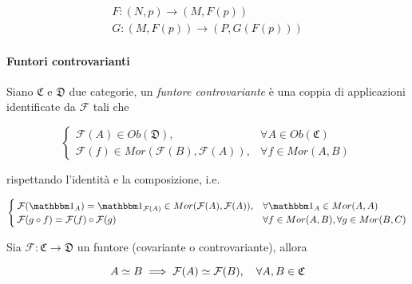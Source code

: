 \begin{gather}
	F : (N,p) \to (M,F(p))\\
	G : (M,F(p)) \to (P,G(F(p)))
\end{gather}

\paragraph{Funtori controvarianti}

Siano $ \mathfrak{C} $ e $ \mathfrak{D} $ due categorie, un \textit{funtore controvariante} è una coppia di applicazioni identificate da $ \mathcal{F} $ tali che

\begin{equation}
	\begin{cases}
		\mathcal{F}(A) \in Ob(\mathfrak{D}), & \forall A \in Ob(\mathfrak{C})\\
		\mathcal{F}(f) \in Mor(\mathcal{F}(B),\mathcal{F}(A)), & \forall f \in Mor(A,B)
	\end{cases}
\end{equation}

rispettando l'identità e la composizione, i.e.

\begin{equation}
	\begin{cases}
		\mathcal{F}(\bigone_{A}) = \bigone_{\mathcal{F}(A)} \in Mor(\mathcal{F}(A),\mathcal{F}(A)), & \forall \bigone_{A} \in Mor(A,A)\\
		\mathcal{F}(g \circ f) = \mathcal{F}(f) \circ \mathcal{F}(g) & \forall f \in Mor(A,B), \forall g \in Mor(B,C)
	\end{cases}
\end{equation}

\begin{remark}
	Sia $ \mathcal{F} : \mathfrak{C} \to \mathfrak{D} $ un funtore (covariante o controvariante), allora
	
	\begin{equation}
		A \simeq B \implies \mathcal{F}(A) \simeq \mathcal{F}(B) \qcomma \forall A,B \in \mathfrak{C}
	\end{equation}
\end{remark}

